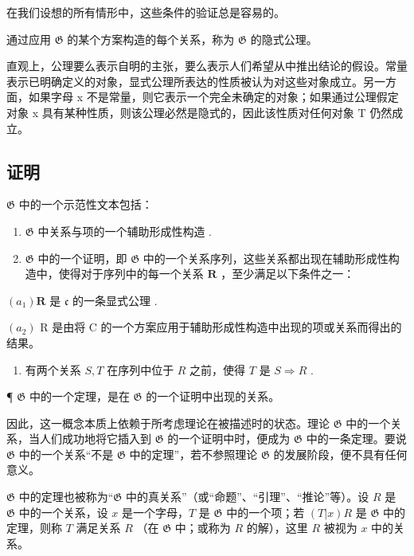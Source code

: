 在我们设想的所有情形中，这些条件的验证总是容易的。

通过应用 \(\mathfrak{G}\) 的某个方案构造的每个关系，称为 \(\mathfrak{G}\) 的隐式公理。

直观上，公理要么表示自明的主张，要么表示人们希望从中推出结论的假设。常量表示已明确定义的对象，显式公理所表达的性质被认为对这些对象成立。另一方面，如果字母 x 不是常量，则它表示一个完全未确定的对象；如果通过公理假定对象 x 具有某种性质，则该公理必然是隐式的，因此该性质对任何对象 T 仍然成立。

\subsection{证明}

\(\mathfrak{G}\) 中的一个示范性文本包括：

\begin{enumerate}
\def\labelenumi{(\arabic{enumi})}
\item
  \(\mathfrak{G}\) 中关系与项的一个辅助形成性构造 .
\item
  \(\mathfrak{G}\) 中的一个证明，即 \(\mathfrak{G}\) 中的一个关系序列，这些关系都出现在辅助形成性构造中，使得对于序列中的每一个关系 \(\pmb{R}\) ，至少满足以下条件之一：
\end{enumerate}

\((a_{1})\boldsymbol{R}\) 是 \(\mathfrak{c}\) 的一条显式公理 .

\((a_{2})\) R 是由将 C 的一个方案应用于辅助形成性构造中出现的项或关系而得出的结果。

\begin{enumerate}
\def\labelenumi{(\alph{enumi})}
\setcounter{enumi}{1}
\tightlist
\item
  有两个关系 \(S, T\) 在序列中位于 \(R\) 之前，使得 \(T\) 是 \(S \Longrightarrow R\) .
\end{enumerate}

¶ \(\mathfrak{G}\) 中的一个定理，是在 \(\mathfrak{G}\) 的一个证明中出现的关系。

因此，这一概念本质上依赖于所考虑理论在被描述时的状态。理论 \(\mathfrak{G}\) 中的一个关系，当人们成功地将它插入到 \(\mathfrak{G}\) 的一个证明中时，便成为 \(\mathfrak{G}\) 中的一条定理。要说 \(\mathfrak{G}\) 中的一个关系``不是 \(\mathfrak{G}\) 中的定理''，若不参照理论 \(\mathfrak{G}\) 的发展阶段，便不具有任何意义。

\(\mathfrak{G}\) 中的定理也被称为“\(\mathfrak{G}\) 中的真关系”（或“命题”、“引理”、“推论”等）。设 \(R\) 是 \(\mathfrak{G}\) 中的一个关系，设 \(x\) 是一个字母，\(T\) 是 \(\mathfrak{G}\) 中的一个项；若 \((T|x)R\) 是 \(\mathfrak{G}\) 中的定理，则称 \(T\) 满足关系 \(R\) （在 \(\mathfrak{G}\) 中；或称为 \(R\) 的解），这里 \(R\) 被视为 \(x\) 中的关系。


